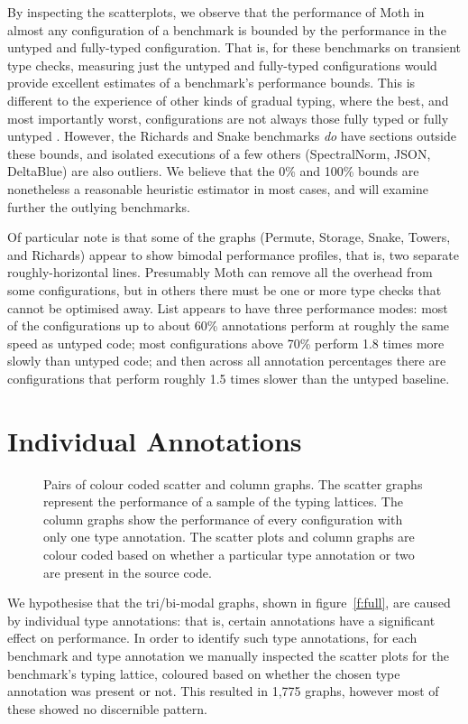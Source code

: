 \documentclass[sigplan,10pt,review,screen]{acmart}\settopmatter{printfolios=true}
\begin{document}
By inspecting the scatterplots, we observe that the performance of
Moth in almost any configuration of a benchmark is bounded by
the performance in the untyped and fully-typed configuration.
That is, for these benchmarks on transient type checks,
measuring just the untyped and fully-typed configurations
would provide excellent estimates of a benchmark's
performance bounds.  This is different to the experience
of other kinds of gradual typing, where the best, and most
importantly worst, configurations are not always those
fully typed or fully untyped \cite{Greenman2019jfp}.
%
However, the Richards and Snake benchmarks \textit{do} have
sections outside these bounds, and isolated executions of
a few others (SpectralNorm, JSON, DeltaBlue) are also outliers.
%
We believe that the 0\% and 100\% bounds are nonetheless a
reasonable heuristic estimator in most cases, and will
examine further the outlying benchmarks.


Of particular note is that some of the graphs (Permute, Storage, Snake, Towers, and Richards) appear to show bimodal performance profiles, that is, two separate roughly-horizontal lines. Presumably Moth can remove all the overhead from some configurations, but in others there must be one or more type checks that cannot be optimised away. List appears to have three performance modes: most of the configurations up to about 60\% annotations perform at roughly the same speed as untyped code; most configurations above 70\% perform 1.8 times more slowly than untyped code; and then across all annotation percentages there are configurations that perform roughly 1.5 times slower than the untyped baseline.



\section{Individual Annotations}
\label{s-individual}
\begin{figure*}
	
	\caption{Pairs of colour coded scatter and column graphs. The scatter graphs represent the performance of a sample of the typing lattices. The column graphs show the performance of every configuration with only one type annotation. The scatter plots and column graphs are colour coded based on whether a particular type annotation or two are present in the source code.}
	\label{f:pattern}		
\end{figure*}
We hypothesise that the tri/bi-modal graphs, shown in figure~\ref{f:full}, are caused by individual type annotations: that is, certain annotations have a significant effect on performance. In order to identify such type annotations, for each benchmark and type annotation we manually inspected the scatter plots for the benchmark's typing lattice, coloured based on whether the chosen type annotation was present or not. This resulted in 1,775 graphs, however most of these showed no discernible pattern.
\end{document}
